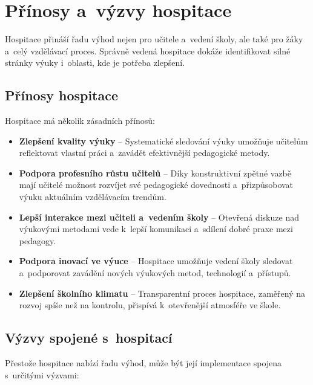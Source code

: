 \section{Přínosy a~výzvy hospitace}

Hospitace přináší řadu výhod nejen pro učitele a~vedení školy, ale také pro žáky a~celý vzdělávací proces. Správně vedená hospitace dokáže identifikovat silné stránky výuky i~oblasti, kde je potřeba zlepšení.


\subsection{Přínosy hospitace}

Hospitace má několik zásadních přínosů:

\begin{itemize}
    \item \textbf{Zlepšení kvality výuky} – Systematické sledování výuky umožňuje učitelům reflektovat vlastní práci a~zavádět efektivnější pedagogické metody.
    \item \textbf{Podpora profesního růstu učitelů} – Díky konstruktivní zpětné vazbě mají učitelé možnost rozvíjet své pedagogické dovednosti a~přizpůsobovat výuku aktuálním vzdělávacím trendům.
    \item \textbf{Lepší interakce mezi učiteli a~vedením školy} – Otevřená diskuze nad výukovými metodami vede k~lepší komunikaci a~sdílení dobré praxe mezi pedagogy.
    \item \textbf{Podpora inovací ve výuce} – Hospitace umožňuje vedení školy sledovat a~podporovat zavádění nových výukových metod, technologií a~přístupů.
    \item \textbf{Zlepšení školního klimatu} – Transparentní proces hospitace, zaměřený na rozvoj spíše než na kontrolu, přispívá k~otevřenější atmosféře ve škole.
\end{itemize}

\subsection{Výzvy spojené s~hospitací}

Přestože hospitace nabízí řadu výhod, může být její implementace spojena s~určitými výzvami:

